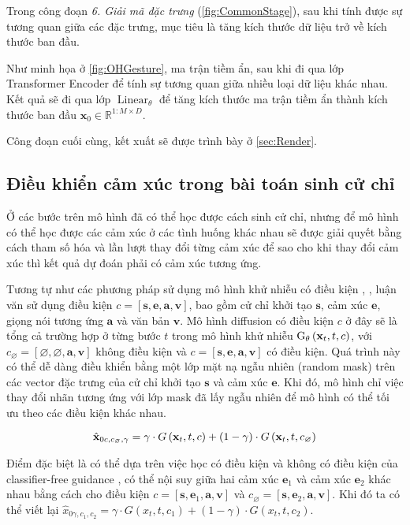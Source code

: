 Trong công đoạn \textit{6. Giải mã đặc trưng} (\autoref{fig:CommonStage}), sau khi tính được sự tương quan giữa các đặc trưng, mục tiêu là tăng kích thước dữ liệu trở về kích thước ban đầu.

Như minh họa ở \autoref{fig:OHGesture}, ma trận tiềm ẩn, sau khi đi qua lớp Transformer Encoder để tính sự tương quan giữa nhiều loại dữ liệu khác nhau. Kết quả sẽ đi qua lớp $\operatorname{Linear}_{\theta}$ để tăng kích thước ma trận tiềm ẩn thành kích thước ban  đầu $\hat{\mathbf{x}}_{0} \in \mathbb{R}^{1:M \times D}$.

Công đoạn cuối cùng, kết xuất sẽ được trình bày ở \autoref{sec:Render}.

\subsection{Điều khiển cảm xúc trong bài toán sinh cử chỉ}

Ở các bước trên mô hình đã có thể học được cách sinh cử chỉ, nhưng để mô hình có thể học được các cảm xúc ở các tình huống khác nhau sẽ được giải quyết bằng cách tham số hóa và lần lượt thay đổi từng cảm xúc để sao cho khi thay đổi cảm xúc thì kết quả dự đoán phải có cảm xúc tương ứng.

Tương tự như các phương pháp sử dụng mô hình khử nhiễu có điều kiện \cite{ho2022classifier}, \cite{tevet2022human}, luận văn sử dụng điều kiện $c = [ \mathbf{s}, \mathbf{e}, \mathbf{a}, \mathbf{v} ]$,  bao gồm cử chỉ khởi tạo $\mathbf{s}$, cảm xúc $\mathbf{e}$, giọng nói tương ứng $\mathbf{a}$ và văn bản $\mathbf{v}$. Mô hình diffusion có điều kiện $c$ ở đây sẽ là tổng cả trường hợp ở từng bước $t$ trong mô hình khử nhiễu $\text{G}_\theta \left( \mathbf{x}_{t}, t, c \right)$, với  $c_{\varnothing}=[\varnothing, \varnothing, \mathbf{a}, \mathbf{v}]$ không điều kiện và $c = [\mathbf{s}, \mathbf{e}, \mathbf{a}, \mathbf{v}]$ có điều kiện. Quá trình này có thể dễ dàng điều khiển bằng một lớp mặt nạ ngẫu nhiên (random mask) trên các vector đặc trưng của cử chỉ khởi tạo $\mathbf{s}$ và cảm xúc $\mathbf{e}$. Khi đó, mô hình chỉ việc thay đổi nhãn tương ứng với lớp mask đã lấy ngẫu nhiên để mô hình có thể tối ưu theo các điều kiện khác nhau. 


\begin{equation} \label{eq:denoise}
\hat{\mathbf{x}}_{0 c, c_{\varnothing}, \gamma}=\gamma \cdot G \left(\mathbf{x}_{t}, t, c\right)+(1-\gamma) \cdot G \left(\mathbf{x}_{t}, t, c_{\varnothing}\right)
\end{equation}

Điểm đặc biệt là có thể dựa trên việc học có điều kiện và không có điều kiện của classifier-free guidance \cite{ho2022classifier}, có thể nội suy giữa hai cảm xúc $\mathbf{e}_1$ và cảm xúc $\mathbf{e}_2$ khác nhau bằng cách cho điều kiện $c = \left[\mathbf{s}, \mathbf{e}_{1}, \mathbf{a}, \mathbf{v} \right]$ và $c_\varnothing = \left[\mathbf{s}, \mathbf{e}_{2}, \mathbf{a}, \mathbf{v} \right]$. Khi đó ta có thể viết lại $\hat{x}_{0 \gamma, c_{1}, c_{2}}=\gamma  \cdot G \left(x_{t}, t, c_{1} \right)+(1-\gamma) \cdot G \left(x_{t}, t, c_{2}\right)$.


